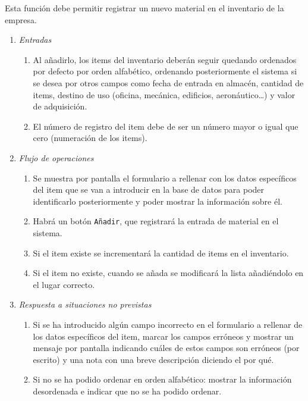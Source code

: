 
	Esta función debe permitir registrar un nuevo material en el inventario de la empresa.

\begin{enumerate}
	\item \textit{Entradas}
	\begin{enumerate}
		\item Al añadirlo, los items del inventario deberán seguir quedando ordenados por defecto por orden alfabético, ordenando posteriormente el sistema si se desea por otros campos como fecha de entrada en almacén, cantidad de items, destino de uso (oficina, mecánica, edificios, aeronáutico\ldots) y valor de adquisición.
		\item El número de registro del item debe de ser un número mayor o igual que cero (numeración de los items).
	\end{enumerate}
	\item \textit{Flujo de operaciones}
	\begin{enumerate}
		\item Se muestra por pantalla el formulario a rellenar con los datos específicos del item que se van a introducir en la base de datos para poder identificarlo posteriormente y poder mostrar la información sobre él.
		\item Habrá un botón \verb|Añadir|, que registrará la entrada de material en el sistema.
		\item Si el item existe se incrementará la cantidad de items en el inventario.
		\item Si el item no existe, cuando se añada se modificará la lista añadiéndolo en el lugar correcto.
	\end{enumerate}
	\item \textit{Respuesta a situaciones no previstas}
	\begin{enumerate}
		\item Si se ha introducido algún campo incorrecto en el formulario a rellenar de los datos específicos del item, marcar los campos erróneos y mostrar un mensaje por pantalla indicando cuáles de estos campos son erróneos (por escrito) y una nota con una breve descripción diciendo el por qué.
		\item Si no se ha podido ordenar en orden alfabético: mostrar la información desordenada e indicar que no se ha podido ordenar.
	\end{enumerate}

\end{enumerate}
\label{fun:EntrMat}
